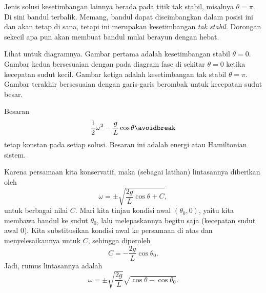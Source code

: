 Jenis solusi kesetimbangan lainnya berada pada titik tak stabil, misalnya
$\theta = \pi$. Di sini bandul terbalik. Memang, bandul dapat diseimbangkan
dalam posisi ini dan akan tetap di sana, tetapi ini merupakan kesetimbangan
\emph{tak stabil}. Dorongan sekecil apa pun akan membuat bandul mulai berayun
dengan hebat.

Lihat  untuk diagramnya. Gambar pertama adalah
kesetimbangan stabil $\theta = 0$. Gambar kedua bersesuaian dengan
 pada diagram fase di sekitar
$\theta =0$ ketika kecepatan sudut kecil. Gambar ketiga adalah kesetimbangan
tak stabil $\theta = \pi$. Gambar terakhir bersesuaian dengan garis-garis
berombak untuk kecepatan sudut besar.

\begin{myfig}
\capstart
{}
\caption{Berbagai kemungkinan gerak bandul. \label{fig:nlin-pend}}
\end{myfig}

Besaran
\begin{equation*}
\frac{1}{2} \omega^2  - \frac{g}{L} \cos \theta 
\avoidbreak
\end{equation*}
tetap konstan pada setiap solusi. Besaran ini adalah energi atau Hamiltonian
sistem.

Karena persamaan kita konservatif, maka (sebagai latihan)
lintasannya diberikan oleh
\begin{equation*}
\omega = \pm \sqrt{ \frac{2g}{L} \cos \theta + C} ,
\end{equation*}
untuk berbagai nilai $C$.
Mari kita tinjau kondisi awal $(\theta_0,0)$, yaitu kita membawa bandul ke
sudut $\theta_0$, lalu melepaskannya begitu saja (kecepatan sudut awal 0).
Kita substitusikan kondisi awal ke persamaan di atas dan menyelesaikannya
untuk $C$, sehingga diperoleh
\begin{equation*}
C = - \frac{2g}{L} \cos \theta_0 .
\end{equation*}
Jadi, rumus lintasannya adalah
\begin{equation*}
\omega = \pm \sqrt{ \frac{2g}{L}} \sqrt{ \cos \theta - \cos \theta_0 } .
\end{equation*}

